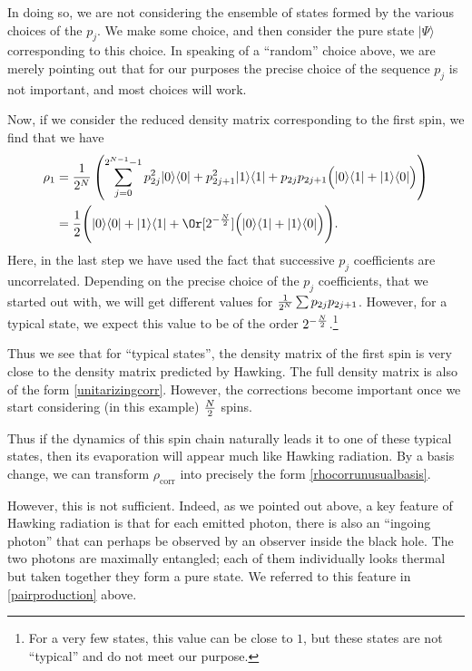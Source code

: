 In doing so, we are not considering the ensemble of states formed by the various choices of the $p_j$. We make some choice, and then consider the pure state $|\Psi\rangle$ corresponding to this choice. In speaking of a ``random'' choice above, we are merely pointing out that for our purposes the precise choice of the sequence $p_j$ is not important, and most choices will work.

Now, if we consider the reduced density matrix corresponding to the first spin, we find that we have
\begin{align}
\rho_1 &= {1 \over 2^{N}} \left(\sum_{j=0}^{2^{N-1}-1} p_{2 j}^2 |0 \rangle \langle 0| + p_{2 j+1}^2 |1 \rangle \langle 1| + p_{2 j} p_{2 j +1}\Big(
|0 \rangle \langle 1| +|1 \rangle \langle 0| \Big)\right) \\
&= {1 \over 2} \Bigg(|0 \rangle \langle 0| + |1 \rangle \langle 1| + \Or[2^{-{N\over2}}] \Big(|0 \rangle \langle 1|+|1 \rangle \langle 0| \Big) \Bigg).
\end{align}
Here, in the last step we have used the fact that successive $p_j$ coefficients are uncorrelated. Depending on the precise choice of the $p_j$ coefficients, that we started out with, we will get different values for ${1 \over 2^N} \sum p_{2 j} p_{2 j + 1}$. However, for a typical state, we expect this value to be of the order $2^{-{N \over 2}}$.\footnote{For a very few states, this value can be close to $1$, but these states are not ``typical'' and do not meet our purpose.}

Thus we see that for ``typical states'', the density matrix of the first spin is very close to the density matrix predicted by Hawking. The full density matrix is also of the form \eqref{unitarizingcorr}. However, the corrections become important once we start considering (in this example) ${N \over 2}$ spins. 

Thus if the dynamics of this spin chain naturally leads it to one of these typical states, then its evaporation will appear much like Hawking radiation. By a basis change, we can transform $\rho_{\text{corr}}$ into precisely the form \eqref{rhocorrunusualbasis}.

However, this is not sufficient. Indeed, as we pointed out above, a key feature of Hawking radiation is that for each emitted photon, there is also an ``ingoing photon'' that can perhaps be observed by an observer inside the black hole. The two photons are maximally entangled; each of them individually looks thermal but taken together they form a pure state. We referred to this feature in \eqref{pairproduction} above.

